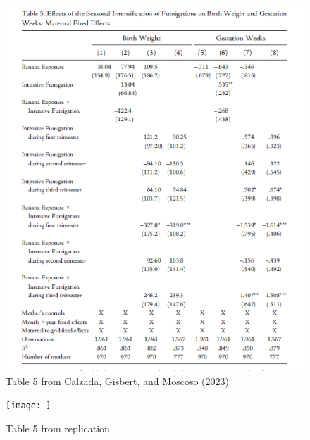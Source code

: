 \documentclass[hyperref={pdfpagelabels=false}]{beamer}
\begin{document}
 \begin{frame}{}

\begin{figure}
    \centering
    \includegraphics[scale=0.4]{figures-paper/table5.png}
    \caption{Table 5 from Calzada, Gisbert, and Moscoso (2023)}
    \label{fig:enter-label}
\end{figure}
   
\end{frame}

 \begin{frame}{}

\begin{figure}
    \centering
    \texttt{[image: ]}
    \caption{Table 5 from  replication}
    \label{fig:enter-label}
\end{figure}

    
\end{frame}
\end{document}
